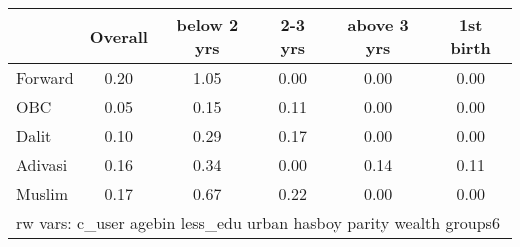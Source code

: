 \begin{tabular}{l*{5}{c}}
\toprule
            &\multicolumn{1}{c}{Overall}&\multicolumn{1}{c}{below 2 yrs}&\multicolumn{1}{c}{2-3 yrs}&\multicolumn{1}{c}{above 3 yrs}&\multicolumn{1}{c}{1st birth}\\
\midrule
\midrule
Forward     &        0.20&        1.05&        0.00&        0.00&        0.00\\
OBC         &        0.05&        0.15&        0.11&        0.00&        0.00\\
Dalit       &        0.10&        0.29&        0.17&        0.00&        0.00\\
Adivasi     &        0.16&        0.34&        0.00&        0.14&        0.11\\
Muslim      &        0.17&        0.67&        0.22&        0.00&        0.00\\
\bottomrule
\multicolumn{6}{l}{\footnotesize rw vars: c\_user agebin less\_edu urban hasboy parity wealth groups6}\\
\end{tabular}
